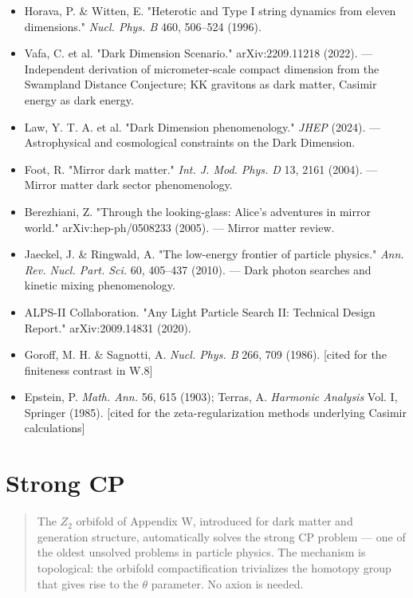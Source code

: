 \documentclass[aps,prd,preprint,superscriptaddress,longbibliography,floatfix]{revtex4-2}
\theoremstyle{remark}
\begin{document}
\begin{itemize}
  \item Horava, P. \& Witten, E. "Heterotic and Type I string dynamics from eleven dimensions." \textit{Nucl. Phys. B} 460, 506--524 (1996).
  \item Vafa, C. et al. "Dark Dimension Scenario." arXiv:2209.11218 (2022). --- Independent derivation of micrometer-scale compact dimension from the Swampland Distance Conjecture; KK gravitons as dark matter, Casimir energy as dark energy.
  \item Law, Y. T. A. et al. "Dark Dimension phenomenology." \textit{JHEP} (2024). --- Astrophysical and cosmological constraints on the Dark Dimension.
  \item Foot, R. "Mirror dark matter." \textit{Int. J. Mod. Phys. D} 13, 2161 (2004). --- Mirror matter dark sector phenomenology.
  \item Berezhiani, Z. "Through the looking-glass: Alice's adventures in mirror world." arXiv:hep-ph/0508233 (2005). --- Mirror matter review.
  \item Jaeckel, J. \& Ringwald, A. "The low-energy frontier of particle physics." \textit{Ann. Rev. Nucl. Part. Sci.} 60, 405--437 (2010). --- Dark photon searches and kinetic mixing phenomenology.
  \item ALPS-II Collaboration. "Any Light Particle Search II: Technical Design Report." arXiv:2009.14831 (2020).
  \item Goroff, M. H. \& Sagnotti, A. \textit{Nucl. Phys. B} 266, 709 (1986). [cited for the finiteness contrast in W.8]
  \item Epstein, P. \textit{Math. Ann.} 56, 615 (1903); Terras, A. \textit{Harmonic Analysis} Vol. I, Springer (1985). [cited for the zeta-regularization methods underlying Casimir calculations]
\end{itemize}


\section{Strong CP}


\begin{quote}
The $Z_{2}$ orbifold of Appendix W, introduced for dark matter and generation
structure, automatically solves the strong CP problem --- one of the oldest
unsolved problems in particle physics. The mechanism is topological: the
orbifold compactification trivializes the homotopy group that gives rise
to the $\theta$ parameter. No axion is needed.
\end{quote}
\end{document}
